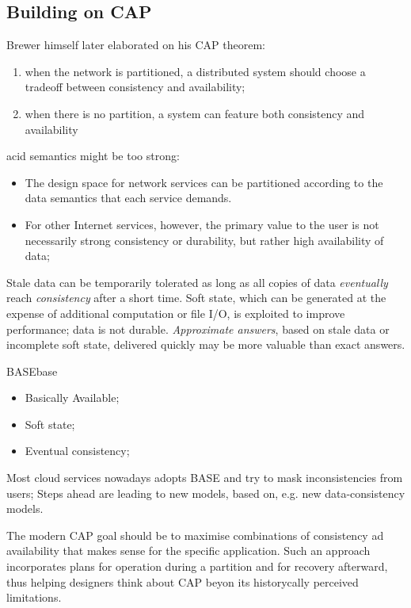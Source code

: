 \documentclass[11pt, a4paper]{article}
\begin{document}
\subsection{Building on CAP}\label{sub:building_on_cap} %
Brewer himself later elaborated on his CAP theorem:
\begin{enumerate}
    \item when the network is partitioned, a distributed system should choose a tradeoff between consistency and availability;
    \item when there is no partition, a system can feature both consistency and availability
\end{enumerate}
\begin{note}
    \acf{acid} semantics might be too strong:
    \begin{itemize}
        \item The design space for network services can be partitioned according to the data semantics that each service demands.
        \item For other Internet services, however, the primary value to the user is not necessarily strong consistency or durability, but rather high availability of data;
    \end{itemize}
\end{note}
Stale data can be temporarily tolerated as long as all copies of data \textit{eventually} reach \textit{consistency} after a short time.
Soft state, which can be generated at the expense of additional computation or file I/O, is exploited to improve performance; data is not durable.
\textit{Approximate answers}, based on stale data or incomplete soft state, delivered quickly may be more valuable than exact answers.
%
\begin{definition}{BASE}{base}
    \begin{itemize}
        \item Basically Available;
        \item Soft state;
        \item Eventual consistency;
    \end{itemize}
\end{definition}
Most cloud services nowadays adopts BASE and try to mask inconsistencies from users; Steps ahead are leading to new models, based on, e.g. new data-consistency models.
\begin{note}
    The modern CAP goal should be to maximise combinations of consistency ad availability that makes sense for the specific application.
    Such an approach incorporates plans for operation during a partition and for recovery afterward, thus helping designers think about CAP beyon its historycally perceived limitations.
\end{note}
%
\end{document}
